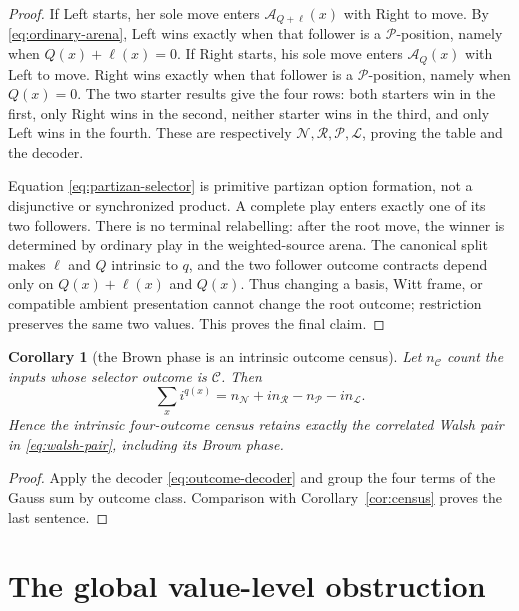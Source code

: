 \documentclass[11pt]{article}
\newtheorem{corollary}[theorem]{Corollary}
\theoremstyle{definition}
\theoremstyle{remark}
\begin{document}
\begin{proof}
If Left starts, her sole move enters $\mathcal A_{Q+\ell}(x)$ with Right to
move.  By \eqref{eq:ordinary-arena}, Left wins exactly when that follower is a
$\mathcal P$-position, namely when $Q(x)+\ell(x)=0$.  If Right starts, his
sole move enters $\mathcal A_Q(x)$ with Left to move.  Right wins exactly when
that follower is a $\mathcal P$-position, namely when $Q(x)=0$.
The two starter results give the four rows: both starters win in the first,
only Right wins in the second, neither starter wins in the third, and only
Left wins in the fourth.  These are respectively
$\mathcal N,\mathcal R,\mathcal P,\mathcal L$, proving the table and the
decoder.

Equation \eqref{eq:partizan-selector} is primitive partizan option formation,
not a disjunctive or synchronized product.  A complete play enters exactly one
of its two followers.  There is no terminal relabelling: after the root move,
the winner is determined by ordinary play in the weighted-source arena.  The
canonical split makes $\ell$ and $Q$ intrinsic to $q$, and the two follower
outcome contracts depend only on $Q(x)+\ell(x)$ and $Q(x)$.  Thus changing a
basis, Witt frame, or compatible ambient presentation cannot change the root
outcome; restriction preserves the same two values.  This proves the final
claim.
\end{proof}

\begin{corollary}[the Brown phase is an intrinsic outcome census]
\label{cor:outcome-census}
Let $n_{\mathcal C}$ count the inputs whose selector outcome is
$\mathcal C$.  Then
\begin{equation}\label{eq:outcome-gauss}
 \sum_x i^{q(x)}
 =n_{\mathcal N}+i n_{\mathcal R}
  -n_{\mathcal P}-i n_{\mathcal L}.
\end{equation}
Hence the intrinsic four-outcome census retains exactly the correlated Walsh
pair in \eqref{eq:walsh-pair}, including its Brown phase.
\end{corollary}

\begin{proof}
Apply the decoder \eqref{eq:outcome-decoder} and group the four terms of the
Gauss sum by outcome class.  Comparison with Corollary~\ref{cor:census}
proves the last sentence.
\end{proof}

\section{The global value-level obstruction}
\end{document}
